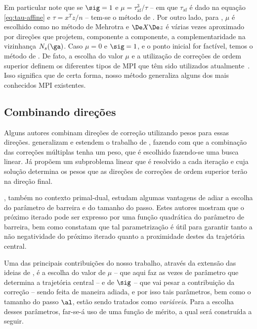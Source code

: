 Em particular note
que se  $\sig = 1$ e $\mu = \tau_{\text{af}}^3/\tau$ -- em que $\tau_{\text{af}}$ é dado
na equação \eqref{eq:tau-affine} e $\tau=x^Tz/n$ -- tem-se o método de
\textcite{Mehrotra:1992wr}. Por outro lado, para \textcite{Gondzio:1996uw}, $\mu$ é
escolhido como no método de Mehrotra e $\DeX\Dez$ é várias vezes aproximado por
direções que projetem, componente a componente, a complementaridade na
vizinhança $N_s(\ga)$. Caso $\mu=0$ e $\sig=1$, e o ponto inicial for factível, temos o método de \textcite{Monteiro:1990vn}.
 De fato, a escolha do valor $\mu$ e a utilização de
correções de ordem superior definem os diferentes tipos de \ac{MPI} que têm sido
utilizados atualmente~\cite{Wright:Primal-dual-interior-point:1997h}. Isso significa que de certa forma, nosso método generaliza alguns dos mais conhecidos \ac{MPI} existentes.




\subsection{Combinando direções}




Alguns autores 
combinam direções de correção utilizando pesos para essas direções.
 \textcite{Colombo:2008ia} generalizam e estendem o trabalho de \textcite{Gondzio:1996uw},
fazendo com que a combinação das correções múltiplas  tenha um peso, que é
escolhido fazendo-se uma busca linear. Já \textcite{Jarre:1999tl}  propõem um subproblema
linear que é resolvido a cada iteração e cuja solução determina os pesos que as direções de 
correções de ordem superior terão na direção final. 

\textcite{VillasBoas:2003tg}, também no contexto primal-dual, estudam algumas
vantagens de adiar a escolha do parâmetro de barreira e do tamanho do passo.
Estes autores mostram que o próximo iterado pode ser expresso por uma função
quadrática do parâmetro de barreira, bem como constatam que tal parametrização é útil
para garantir tanto a não negatividade do próximo iterado quanto a proximidade destes da
trajetória central. 

Uma das principais contribuições do nosso trabalho, através da extensão das ideias
de \textcite{VillasBoas:2003tg}, é a escolha do valor de $\mu$ -- que aqui faz as
vezes de parâmetro que determina a trajetória central -- e de $\sig$ -- que vai pesar a contribuição da correção --  sendo feita de maneira adiada, e
por isso tais parâmetros, bem como o tamanho do passo $\al$, estão sendo
tratados como \emph{variáveis}. Para a escolha desses parâmetros, far-se-á uso de uma
função de mérito, a qual será construída a seguir.
 
